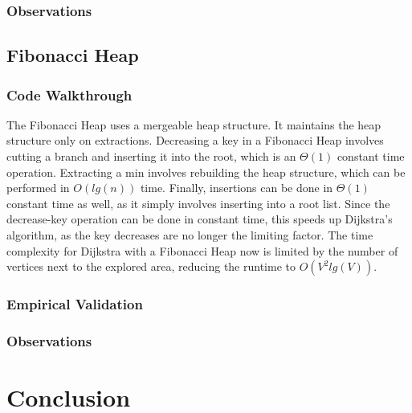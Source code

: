 \documentclass[a4paper,12pt]{article}
\begin{document}
\subsubsection{Observations}
\subsection{Fibonacci Heap}
\subsubsection{Code Walkthrough}

The Fibonacci Heap uses a mergeable heap structure. It maintains the heap structure only on extractions. Decreasing a key in a Fibonacci Heap involves cutting a branch and inserting it into the root, which is an $\Theta(1)$ constant time operation. Extracting a min involves rebuilding the heap structure, which can be performed in $O(lg(n))$ time. Finally, insertions can be done in $\Theta(1)$ constant time as well, as it simply involves inserting into a root list. Since the decrease-key operation can be done in constant time, this speeds up Dijkstra's algorithm, as the key decreases are no longer the limiting factor. The time complexity for Dijkstra with a Fibonacci Heap now is limited by the number of vertices next to the explored area, reducing the runtime to $O(V^2lg(V))$.
\subsubsection{Empirical Validation}
\subsubsection{Observations}
\section{Conclusion}
\end{document}
